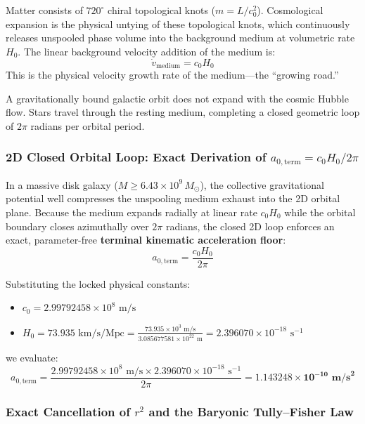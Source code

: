 \documentclass[11pt,a4paper]{article}
\begin{document}
Matter consists of $720^\circ$ chiral topological knots ($m = L/c_0^2$). Cosmological expansion is the physical untying of these topological knots, which continuously releases unspooled phase volume into the background medium at volumetric rate $H_0$. The linear background velocity addition of the medium is:
\begin{equation}
\dot{v}_{\text{medium}} = c_0 H_0
\label{eq:v_dot_medium}
\end{equation}
This is the physical velocity growth rate of the medium---the ``growing road.''

A gravitationally bound galactic orbit does not expand with the cosmic Hubble flow. Stars travel through the resting medium, completing a closed geometric loop of $2\pi$ radians per orbital period.

\subsubsection{2D Closed Orbital Loop: Exact Derivation of $a_{0,\text{term}} = c_0 H_0 / 2\pi$}
\label{subsubsec:a0_term_derivation}

In a massive disk galaxy ($M \ge 6.43 \times 10^9\,M_\odot$), the collective gravitational potential well compresses the unspooling medium exhaust into the 2D orbital plane. Because the medium expands radially at linear rate $c_0 H_0$ while the orbital boundary closes azimuthally over $2\pi$ radians, the closed 2D loop enforces an exact, parameter-free \textbf{terminal kinematic acceleration floor}:
\begin{equation}
a_{0,\text{term}} = \frac{c_0 H_0}{2\pi}
\label{eq:a0_term_def}
\end{equation}

Substituting the locked physical constants:
\begin{itemize}
    \item $c_0 = 2.99792458 \times 10^8\text{ m/s}$
    \item $H_0 = 73.935\text{ km/s/Mpc} = \frac{73.935 \times 10^3\text{ m/s}}{3.085677581 \times 10^{22}\text{ m}} = 2.396070 \times 10^{-18}\text{ s}^{-1}$
\end{itemize}
we evaluate:
\begin{equation}
a_{0,\text{term}} = \frac{2.99792458 \times 10^8\text{ m/s} \times 2.396070 \times 10^{-18}\text{ s}^{-1}}{2\pi} = \mathbf{1.143248 \times 10^{-10}\text{ m/s}^2}
\label{eq:a0_term_val}
\end{equation}

\subsubsection{Exact Cancellation of $r^2$ and the Baryonic Tully--Fisher Law}
\label{subsubsec:btfr_derivation}
\end{document}
